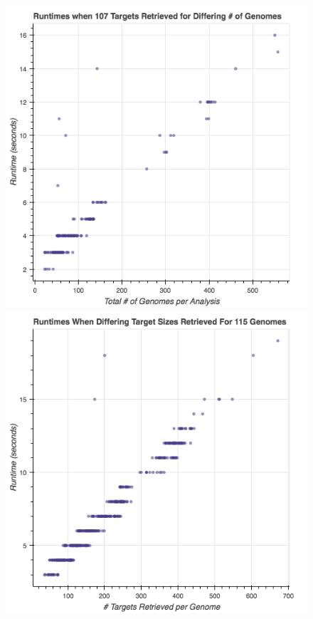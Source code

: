 \documentclass{article}
\begin{document}
\begin{figure}[!htb]
  \includegraphics[width=\linewidth]{images/fishers_genomes.png}
\endminipage\hfill
{}
  \includegraphics[width=\linewidth]{images/fishers_targets.png}

\end{figure}
\end{document}
